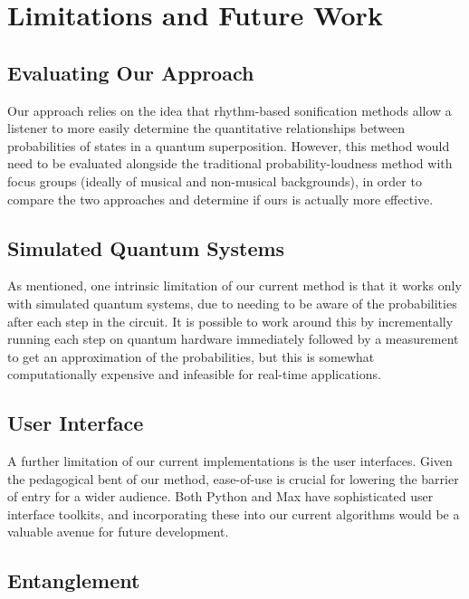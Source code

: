 \documentclass[10pt,twocolumn]{article}
\begin{document}
\section{Limitations and Future Work}

\subsection{Evaluating Our Approach}

Our approach relies on the idea that rhythm-based sonification methods allow a listener to more easily determine the quantitative relationships between probabilities of states in a quantum superposition. However, this method would need to be evaluated alongside the traditional probability-loudness method with focus groups (ideally of musical and non-musical backgrounds), in order to compare the two approaches and determine if ours is actually more effective.  

\subsection{Simulated Quantum Systems}

As mentioned, one intrinsic limitation of our current method is that it works only with simulated quantum systems, due to needing to be aware of the probabilities after each step in the circuit. It is possible to work around this by incrementally running each step on quantum hardware immediately followed by a measurement to get an approximation of the probabilities, but this is somewhat computationally expensive and infeasible for real-time applications\cite{qiskitalgos}.

\subsection{User Interface}

A further limitation of our current implementations is the user interfaces. Given the pedagogical bent of our method, ease-of-use is crucial for lowering the barrier of entry for a wider audience\cite{faghih2014}. Both Python and Max have sophisticated user interface toolkits, and incorporating these into our current algorithms would be a valuable avenue for future development.

\subsection{Entanglement}
\end{document}
